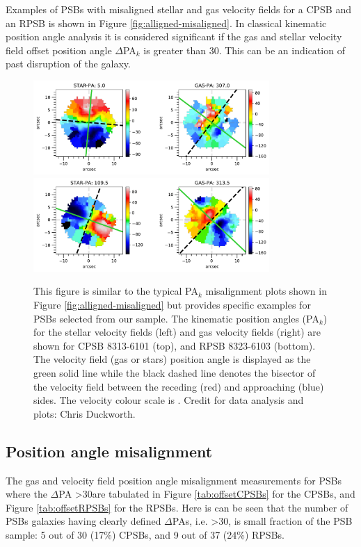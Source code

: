 Examples of PSBs with misaligned stellar and gas velocity fields for a CPSB and an RPSB is shown in Figure \ref{fig:alligned-misaligned}. In classical kinematic position angle analysis it is considered significant if the gas and stellar velocity field offset position angle $\Delta$PA$_{k}$ is greater than 30\textdegree. This can be an indication of past disruption of the galaxy.

\begin{figure}
    \centering
    \includegraphics[width=0.8\textwidth]{images/PAplots/PAplotsCPSB/8313-6101-PA.pdf}
    \includegraphics[width=0.8\textwidth]{images/PAplots/PAplotsRPSB/8323-6103-PA.pdf}
    \caption[Examples of PSBs exhibiting significant $\Delta$PA$_{k}$: CPSB 8313-6101 and RPSB 8323-6103.]{This figure is similar to the typical PA$_{k}$ misalignment plots shown in Figure \ref{fig:alligned-misaligned} but provides specific examples for PSBs selected from our sample. The kinematic position angles (PA$_{k}$) for the stellar velocity fields (left) and gas velocity fields (right) are shown for CPSB 8313-6101 (top), and RPSB 8323-6103 (bottom). The velocity field (gas or stars) position angle is displayed as the green solid line while the black dashed line denotes the bisector of the velocity field between the receding (red) and approaching (blue) sides. The velocity colour scale is \kms. Credit for data analysis and plots: Chris Duckworth.}
    \label{fig:CPSB-8313-6101-PA}
\end{figure}

\subsection{Position angle misalignment}
\label{PA-misalignment}
The gas and velocity field position angle misalignment measurements for PSBs where the $\Delta$PA \textgreater 30\textdegree are tabulated in Figure \ref{tab:offsetCPSBs} for the CPSBs, and Figure \ref{tab:offsetRPSBs} for the RPSBs. Here is can be seen that the number of PSBs galaxies having clearly defined $\Delta$PAs, i.e. \textgreater 30\textdegree, is small fraction of the PSB sample: 5 out of 30 (17\%) CPSBs, and 9 out of 37 (24\%) RPSBs.

